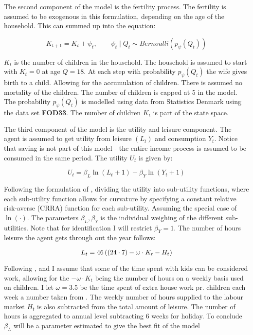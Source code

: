 The second component of the model is the fertility process. The fertility is assumed to be exogenous in this formulation, depending on the age of the household. This can summed up into the equation:

\begin{equation}
    K_{t+1} = K_t+ \psi_t, \qquad \psi_t \mid Q_t \sim Bernoulli (p_\psi(Q_t))
\end{equation}

$K_t$ is the number of children in the household. The household is assumed to start with $K_t = 0$ at age $Q=18$. At each step with probability $p_\psi(Q_t)$ the wife gives birth to a child. Allowing for the accumulation of children. There is assumed no mortality of the children. The number of children is capped at 5 in the model. The probability $p_\psi(Q_t)$ is modelled using data from Statistics Denmark using the data set \textbf{FOD33}. The number of children $K_t$ is part of the state space. 

The third component of the model is the utility and leisure component. The agent is assumed to get utility from leisure $(L_t)$ and consumption $Y_t$. Notice that saving is not part of this model - the entire income process is assumed to be consumed in the same period. The utility $U_t$ is given by:

\begin{equation}
    U_t = \beta_L \ln(L_t + 1) + \beta_Y \ln(Y_t + 1)
\end{equation}

Following the formulation of \textcite{adda_career_2011}, dividing the utility into sub-utility functions, where each sub-utility function allows for curvature by specifying a constant relative risk-averse (CRRA) function for each sub-utility. Assuming the special case of $\ln(\cdot)$. The parameters $\beta_L, \beta_Y$ is the individual weighing of the different sub-utilities. Note that for identification I will restrict $\beta_Y= 1$. The number of hours leisure the agent gets through out the year follows: 

\begin{equation}
    L_t = 46 \left( \left( 24 \cdot 7 \right) - \omega \cdot K_t - H_t \right)
\end{equation}

Following \textcite{firestone_estimation_1988}, \textcite{thrane_men_2000} and \textcite{ekert-jaffe_time_2015} I assume that some of the time spent with kids can be considered work, allowing for the $-\omega \cdot K_t$ being the number of hours on a weekly basis used on children. I let $\omega=3.5$ be the time spent of extra house work pr. children each week a number taken from \textcite{ekert-jaffe_time_2015}. The weekly number of hours supplied to the labour market $H_t$ is also subtracted from the total amount of leisure. The number of hours is aggregated to annual level subtracting 6 weeks for holiday. To conclude $\beta_L$ will be a parameter estimated to give the best fit of the model

